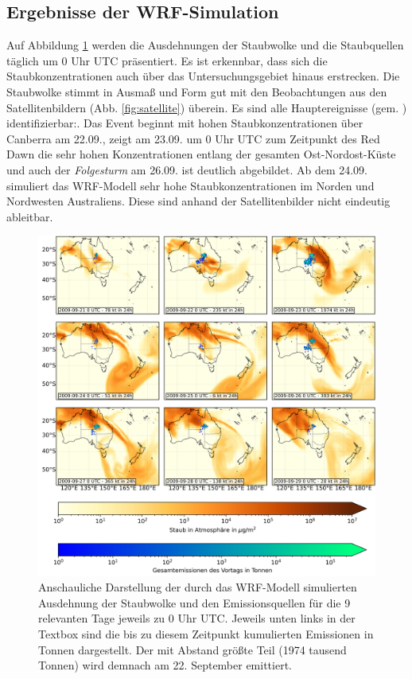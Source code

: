 \documentclass[12pt,a4paper,onecolumn,draft]{scrartcl}
\begin{document}
\subsection{Ergebnisse der WRF-Simulation}
Auf Abbildung \ref{fig:dustload} werden die Ausdehnungen der Staubwolke und die Staubquellen täglich um 0 Uhr UTC präsentiert. Es ist erkennbar, dass sich die Staubkonzentrationen auch über das Untersuchungsgebiet hinaus erstrecken. Die Staubwolke stimmt in Ausmaß und Form gut mit den Beobachtungen aus den Satellitenbildern (Abb. \ref{fig:satellite}) überein. Es sind alle Hauptereignisse (gem. \cite{Leys.2009}) identifizierbar:. Das Event beginnt mit hohen Staubkonzentrationen über Canberra am 22.09., zeigt am 23.09. um 0 Uhr UTC zum Zeitpunkt des Red Dawn die sehr hohen Konzentrationen entlang der gesamten Ost-Nordost-Küste und auch der \textit{Folgesturm} am 26.09. ist deutlich abgebildet. Ab dem 24.09. simuliert das WRF-Modell sehr hohe Staubkonzentrationen im Norden und Nordwesten Australiens. Diese sind anhand der Satellitenbilder nicht eindeutig ableitbar. 
\begin{figure}
\includegraphics[width=\textwidth]{bilder/dustload.png}
\caption{Anschauliche Darstellung der durch das WRF-Modell simulierten Ausdehnung der Staubwolke und den Emissionsquellen für die 9 relevanten Tage jeweils zu 0 Uhr UTC. Jeweils unten links in der Textbox sind die bis zu diesem Zeitpunkt kumulierten Emissionen in Tonnen dargestellt. Der mit Abstand größte Teil (1974 tausend Tonnen) wird demnach am 22. September emittiert. } \label{fig:dustload}
\end{figure}
\end{document}
